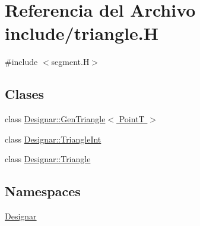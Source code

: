\hypertarget{triangle_8_h}{}\section{Referencia del Archivo include/triangle.H}
\label{triangle_8_h}
{\ttfamily \#include $<$segment.\+H$>$}\newline
\subsection*{Clases}
\begin{DoxyCompactItemize}
\item 
class \hyperlink{class_designar_1_1_gen_triangle}{Designar\+::\+Gen\+Triangle$<$ Point\+T $>$}
\item 
class \hyperlink{class_designar_1_1_triangle_int}{Designar\+::\+Triangle\+Int}
\item 
class \hyperlink{class_designar_1_1_triangle}{Designar\+::\+Triangle}
\end{DoxyCompactItemize}
\subsection*{Namespaces}
\begin{DoxyCompactItemize}
\item 
 \hyperlink{namespace_designar}{Designar}
\end{DoxyCompactItemize}
